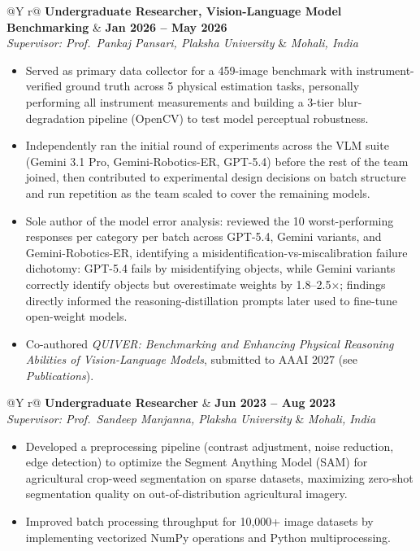 \documentclass[11pt,letterpaper]{article}
\makeatletter
\newcommand{\cventry}[4]{%
    \begin{tabularx}{\linewidth}{@{}Y r@{}}
        \textbf{#1} & \textbf{\footnotesize #2} \\
        \textit{\footnotesize #3} & \textit{\footnotesize #4} \\
    \end{tabularx}%
    \vspace{0.3ex}
}
\makeatother
\begin{document}
\cventry{Undergraduate Researcher, Vision-Language Model Benchmarking}{Jan 2026 -- May 2026}{Supervisor: Prof.\ Pankaj Pansari, Plaksha University}{Mohali, India}
\begin{itemize}
    \item Served as primary data collector for a 459-image benchmark with instrument-verified ground truth across 5 physical estimation tasks, personally performing all instrument measurements and building a 3-tier blur-degradation pipeline (OpenCV) to test model perceptual robustness.
    \item Independently ran the initial round of experiments across the VLM suite (Gemini 3.1 Pro, Gemini-Robotics-ER, GPT-5.4) before the rest of the team joined, then contributed to experimental design decisions on batch structure and run repetition as the team scaled to cover the remaining models.
    \item Sole author of the model error analysis: reviewed the 10 worst-performing responses per category per batch across GPT-5.4, Gemini variants, and Gemini-Robotics-ER, identifying a misidentification-vs-miscalibration failure dichotomy: GPT-5.4 fails by misidentifying objects, while Gemini variants correctly identify objects but overestimate weights by 1.8--2.5$\times$; findings directly informed the reasoning-distillation prompts later used to fine-tune open-weight models.
    \item Co-authored \textit{QUIVER: Benchmarking and Enhancing Physical Reasoning Abilities of Vision-Language Models}, submitted to AAAI 2027 (see \textit{Publications}).
\end{itemize}
 
\vspace{0.02ex}
 
\cventry{Undergraduate Researcher}{Jun 2023 -- Aug 2023}{Supervisor: Prof.\ Sandeep Manjanna, Plaksha University}{Mohali, India}
\begin{itemize}
    \item Developed a preprocessing pipeline (contrast adjustment, noise reduction, edge detection) to optimize the Segment Anything Model (SAM) for agricultural crop-weed segmentation on sparse datasets, maximizing zero-shot segmentation quality on out-of-distribution agricultural imagery.
    \item Improved batch processing throughput for 10,000+ image datasets by implementing vectorized NumPy operations and Python multiprocessing.
\end{itemize}
 
\end{document}
